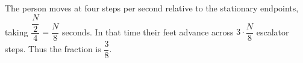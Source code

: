 The person moves at four steps per second relative to the stationary endpoints, taking $\dfrac{\dfrac{N}{2}}{4}=\dfrac{N}{8}$ seconds. In that time their feet advance across $3\cdot\dfrac{N}{8}$ escalator steps. Thus the fraction is $\boxed{\dfrac{3}{8}}$.
